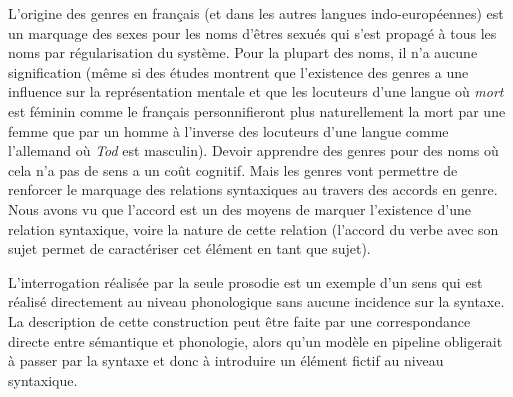 {     L’origine des genres en français (et dans les autres langues indo-européennes) est un marquage des sexes pour les noms d’êtres sexués qui s’est propagé à tous les noms par régularisation du système. Pour la plupart des noms, il n’a aucune signification (même si des études montrent que l’existence des genres a une influence sur la représentation mentale et que les locuteurs d’une langue où \textit{mort} est féminin comme le français personnifieront plus naturellement la mort par une femme que par un homme à l’inverse des locuteurs d’une langue comme l’allemand où \textit{Tod} est masculin). Devoir apprendre des genres pour des noms où cela n’a pas de sens a un coût cognitif. Mais les genres vont permettre de renforcer le marquage des relations syntaxiques au travers des accords en genre. Nous avons vu que l’accord est un des moyens de marquer l’existence d’une relation syntaxique, voire la nature de cette relation (l’accord du verbe avec son sujet permet de caractériser cet élément en tant que sujet).

     L’interrogation réalisée par la seule prosodie est un exemple d’un sens qui est réalisé directement au niveau phonologique sans aucune incidence sur la syntaxe. La description de cette construction peut être faite par une correspondance directe entre sémantique et phonologie, alors qu’un modèle en pipeline obligerait à passer par la syntaxe et donc à introduire un élément fictif au niveau syntaxique.
}
